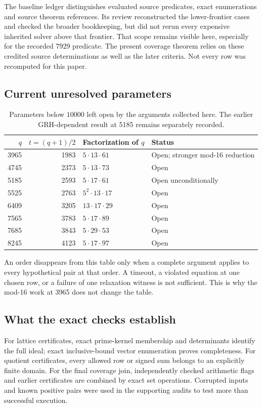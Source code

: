 \documentclass[11pt]{article}
\theoremstyle{definition}
\theoremstyle{remark}
\begin{document}
The baseline ledger distinguishes evaluated source predicates, exact
enumerations and source theorem references. Its review reconstructed the
lower-frontier cases and checked the broader bookkeeping, but did not
rerun every expensive inherited solver above that frontier. That scope
remains visible here, especially for the recorded $7929$ predicate.
The present coverage theorem relies on these credited source
determinations as well as the later criteria. Not every row was recomputed for this paper.

\subsection{Current unresolved parameters}
\begin{table}[ht]
\centering
\begin{tabular}{rrll}
\toprule
$q$ & $t=(q+1)/2$ & Factorization of $q$ & Status\\
\midrule
3965&1983&$5\cdot13\cdot61$&Open; stronger mod-16 reduction\\
4745&2373&$5\cdot13\cdot73$&Open\\
5185&2593&$5\cdot17\cdot61$&Open unconditionally\\
5525&2763&$5^2\cdot13\cdot17$&Open\\
6409&3205&$13\cdot17\cdot29$&Open\\
7565&3783&$5\cdot17\cdot89$&Open\\
7685&3843&$5\cdot29\cdot53$&Open\\
8245&4123&$5\cdot17\cdot97$&Open\\
\bottomrule
\end{tabular}
\caption{Parameters below $10000$ left open by the arguments collected here.
The earlier GRH-dependent result at 5185 remains separately recorded.}
\label{tab:open}
\end{table}
An order disappears from this table only when a complete argument applies
to every hypothetical pair at that order. A timeout, a violated equation
at one chosen row, or a failure of one relaxation witness is not sufficient.
This is why the mod-16 work at 3965 does not change the table.

\subsection{What the exact checks establish}
For lattice certificates, exact prime-kernel membership and determinants
identify the full ideal; exact inclusive-bound vector enumeration proves
completeness. For quotient certificates, every allowed row or signed sum
belongs to an explicitly finite domain. For the final coverage join,
independently checked arithmetic flags and earlier certificates
are combined by exact set operations. Corrupted inputs and known positive
pairs were used in the supporting audits to test more than successful
execution.
\end{document}
